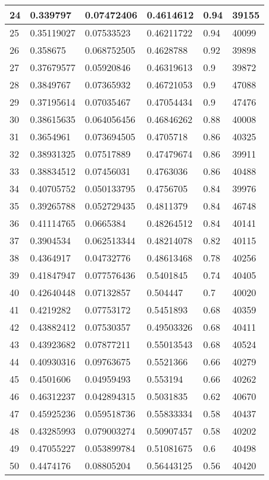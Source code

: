 \begin{longtable}{|l|l|l|l|l|l|}
24 & 0.339797 & 0.07472406 & 0.4614612 & 0.94 & 39155 \\ \hline 
25 & 0.35119027 & 0.07533523 & 0.46211722 & 0.94 & 40099 \\ \hline 
26 & 0.358675 & 0.068752505 & 0.4628788 & 0.92 & 39898 \\ \hline 
27 & 0.37679577 & 0.05920846 & 0.46319613 & 0.9 & 39872 \\ \hline 
28 & 0.3849767 & 0.07365932 & 0.46721053 & 0.9 & 47088 \\ \hline 
29 & 0.37195614 & 0.07035467 & 0.47054434 & 0.9 & 47476 \\ \hline 
30 & 0.38615635 & 0.064056456 & 0.46846262 & 0.88 & 40008 \\ \hline 
31 & 0.3654961 & 0.073694505 & 0.4705718 & 0.86 & 40325 \\ \hline 
32 & 0.38931325 & 0.07517889 & 0.47479674 & 0.86 & 39911 \\ \hline 
33 & 0.38834512 & 0.07456031 & 0.4763036 & 0.86 & 40488 \\ \hline 
34 & 0.40705752 & 0.050133795 & 0.4756705 & 0.84 & 39976 \\ \hline 
35 & 0.39265788 & 0.052729435 & 0.4811379 & 0.84 & 46748 \\ \hline 
36 & 0.41114765 & 0.0665384 & 0.48264512 & 0.84 & 40141 \\ \hline 
37 & 0.3904534 & 0.062513344 & 0.48214078 & 0.82 & 40115 \\ \hline 
38 & 0.4364917 & 0.04732776 & 0.48613468 & 0.78 & 40256 \\ \hline 
39 & 0.41847947 & 0.077576436 & 0.5401845 & 0.74 & 40405 \\ \hline 
40 & 0.42640448 & 0.07132857 & 0.504447 & 0.7 & 40020 \\ \hline 
41 & 0.4219282 & 0.07753172 & 0.5451893 & 0.68 & 40359 \\ \hline 
42 & 0.43882412 & 0.07530357 & 0.49503326 & 0.68 & 40411 \\ \hline 
43 & 0.43923682 & 0.07877211 & 0.55013543 & 0.68 & 40524 \\ \hline 
44 & 0.40930316 & 0.09763675 & 0.5521366 & 0.66 & 40279 \\ \hline 
45 & 0.4501606 & 0.04959493 & 0.553194 & 0.66 & 40262 \\ \hline 
46 & 0.46312237 & 0.042894315 & 0.5031835 & 0.62 & 40670 \\ \hline 
47 & 0.45925236 & 0.059518736 & 0.55833334 & 0.58 & 40437 \\ \hline 
48 & 0.43285993 & 0.079003274 & 0.50907457 & 0.58 & 40202 \\ \hline 
49 & 0.47055227 & 0.053899784 & 0.51081675 & 0.6 & 40498 \\ \hline 
50 & 0.4474176 & 0.08805204 & 0.56443125 & 0.56 & 40420 \\ \hline 
\end{longtable}